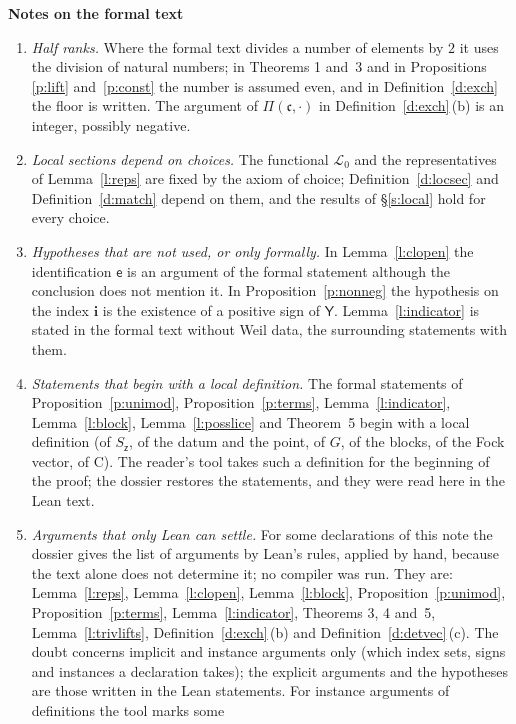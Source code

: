 \documentclass[11pt,a4paper]{article}
\newcommand{\sect}[2]{\refstepcounter{section}\label{#2}\par\addvspace{19pt plus 4pt minus 2pt}\Needspace{7\baselineskip}%
  \noindent\llap{{\fontsize{13.2}{16}\selectfont\bfseries\color{inkfaint}\thesection}\hspace{9pt}}%
  {\fontsize{13.2}{16}\selectfont\bfseries\color{ink}#1}\par\nopagebreak\vspace{-1pt}}
\theoremstyle{plainx}
\theoremstyle{uprightx}
\newcommand{\sY}{\mathsf{Y}}
\newcommand{\se}{\mathsf{e}}
\newcommand{\sz}{\mathsf{z}}
\newcommand{\fc}{\mathfrak{c}}
\newcommand{\rC}{\mathrm{C}}
\newcommand{\cL}{\mathcal{L}}
\newcommand{\LP}[2]{\Pi(#1,#2)}
\begin{document}
\sect{Notes on the formal text}{s:notes}
\begin{enumerate}[label=\textup{\arabic*.},leftmargin=1.6em,itemsep=5pt]
\item \emph{Half ranks.} Where the formal text divides a number of elements by $2$ it uses the division of
natural numbers; in Theorems 1 and~3 and in Propositions \ref{p:lift} and~\ref{p:const} the number is assumed
even, and in Definition~\ref{d:exch} the floor is written. The argument of $\LP{\fc}{\cdot}$ in
Definition~\ref{d:exch}\,(b) is an integer, possibly negative.
\item \emph{Local sections depend on choices.} The functional $\cL_0$ and the representatives of
Lemma~\ref{l:reps} are fixed by the axiom of choice; Definition~\ref{d:locsec} and Definition~\ref{d:match}
depend on them, and the results of §\ref{s:local} hold for every choice.
\item \emph{Hypotheses that are not used, or only formally.} In Lemma~\ref{l:clopen} the identification $\se$ is an
argument of the formal statement although the conclusion does not mention it. In Proposition~\ref{p:nonneg} the
hypothesis on the index $\mathbf{i}$ is the existence of a positive sign of $\sY$. Lemma~\ref{l:indicator} is stated in the
formal text without Weil data, the surrounding statements with them.
\item \emph{Statements that begin with a local definition.} The formal statements of Proposition~\ref{p:unimod},
Proposition~\ref{p:terms}, Lemma~\ref{l:indicator}, Lemma~\ref{l:block}, Lemma~\ref{l:posslice} and Theorem~5
begin with a local definition (of $S_{\sz}$, of the datum and the point, of $G$, of the blocks, of the Fock vector,
of $\rC$). The reader's tool takes such a definition for the beginning of the proof; the dossier restores the
statements, and they were read here in the Lean text.
\item \emph{Arguments that only Lean can settle.} For some declarations of this note the dossier gives the list
of arguments by Lean's rules, applied by hand, because the text alone does not determine it; no compiler was run.
They are: Lemma~\ref{l:reps}, Lemma~\ref{l:clopen}, Lemma~\ref{l:block}, Proposition~\ref{p:unimod},
Proposition~\ref{p:terms}, Lemma~\ref{l:indicator}, Theorems 3, 4 and~5, Lemma~\ref{l:trivlifts},
Definition~\ref{d:exch}\,(b) and Definition~\ref{d:detvec}\,(c). The doubt concerns implicit and instance
arguments only (which index sets, signs and instances a declaration takes); the explicit arguments and the
hypotheses are those written in the Lean statements. For instance arguments of definitions the tool marks some

\end{enumerate}
\end{document}
